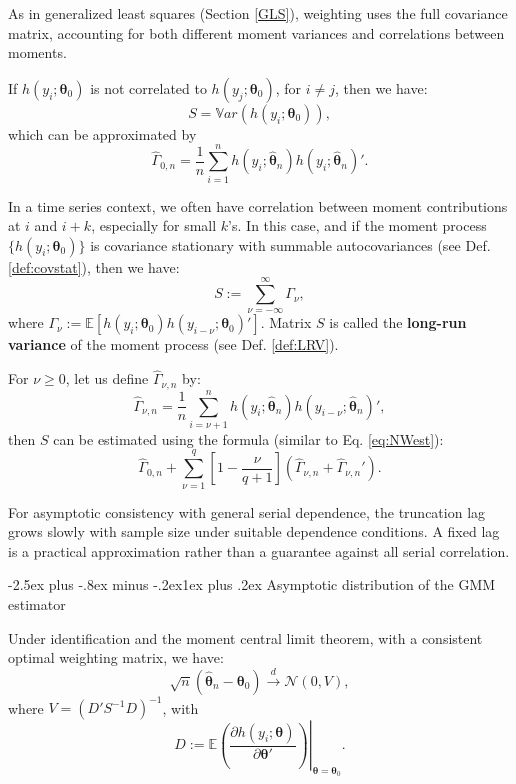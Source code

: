 \documentclass[
  11pt,
]{book}
\makeatletter
\renewcommand\subsection{\@startsection{subsection}{2}{\z@}
  {-2.5ex plus -.8ex minus -.2ex}{1ex plus .2ex}
  {\normalfont\large\bfseries\color{TextbookInk}}}
\theoremstyle{definition}
\theoremstyle{definition}
\theoremstyle{definition}
\theoremstyle{definition}
\theoremstyle{remark}
\makeatother
\begin{document}
As in generalized least squares (Section \ref{GLS}), weighting uses the full covariance matrix, accounting for both different moment variances and correlations between moments.

If \(h(y_i;\boldsymbol\theta_0)\) is not correlated to \(h(y_j;\boldsymbol\theta_0)\), for \(i \ne j\), then we have:
\[
S = \mathbb{V}ar(h(y_i;\boldsymbol\theta_0)),
\]
which can be approximated by
\[
\hat{\Gamma}_{0,n}=\frac{1}{n}\sum_{i=1}^{n} h(y_i;\hat{\boldsymbol\theta}_n)h(y_{i};\hat{\boldsymbol\theta}_n)'.
\]

In a time series context, we often have correlation between moment contributions at \(i\) and \(i+k\), especially for small \(k\)'s. In this case, and if the moment process \(\{h(y_i;\boldsymbol\theta_0)\}\) is covariance stationary with summable autocovariances (see Def. \ref{def:covstat}), then we have:
\[
S := \sum_{\nu = -\infty}^{\infty} \Gamma_\nu,
\]
where \(\Gamma_\nu := \mathbb{E}[h(y_i;\boldsymbol\theta_0) h(y_{i-\nu};\boldsymbol\theta_0)']\). Matrix \(S\) is called the \textbf{long-run variance} of the moment process (see Def. \ref{def:LRV}).

For \(\nu \ge 0\), let us define \(\hat{\Gamma}_{\nu,n}\) by:
\[
\hat{\Gamma}_{\nu,n} = \frac{1}{n} \sum_{i=\nu + 1}^{n} h(y_i;\hat{\boldsymbol\theta}_n)h(y_{i-\nu};\hat{\boldsymbol\theta}_n)',
\]
then \(S\) can be estimated using the \citet{Newey_West_1987} formula (similar to Eq. \eqref{eq:NWest}):
\begin{equation}
\hat{\Gamma}_{0,n} + \sum_{\nu=1}^{q}\left[1-\frac{\nu}{q+1}\right](\hat{\Gamma}_{\nu,n}+\hat{\Gamma}_{\nu,n}').    \label{eq:Shat}
\end{equation}

For asymptotic consistency with general serial dependence, the truncation lag grows slowly with sample size under suitable dependence conditions. A fixed lag is a practical approximation rather than a guarantee against all serial correlation.

\subsection{Asymptotic distribution of the GMM estimator}\label{asymptotic-distribution-of-the-gmm-estimator}

Under identification and the moment central limit theorem, with a consistent optimal weighting matrix, we have:
\begin{equation}
\boxed{\sqrt{n}(\hat{\boldsymbol\theta}_n - \boldsymbol\theta_0) \overset{d}{\rightarrow} \mathcal{N}(0,V),}\label{eq:asymptGMM}
\end{equation}
where \(V = (D'S^{-1}D)^{-1}\), with
\[
D := \left.\mathbb{E}\left(\frac{\partial h(y_i;\boldsymbol\theta)}{\partial \boldsymbol\theta'}\right)\right|_{\boldsymbol\theta = \boldsymbol\theta_0}.
\]
\end{document}
